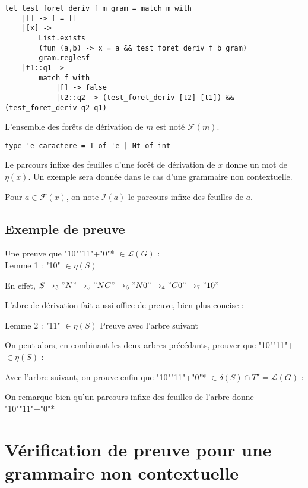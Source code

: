 \documentclass[a4paper,12pt]{article}
\begin{document}
\begin{verbatim}
let test_foret_deriv f m gram = match m with
    |[] -> f = []
    |[x] -> 
        List.exists 
        (fun (a,b) -> x = a && test_foret_deriv f b gram) 
        gram.reglesf
    |t1::q1 -> 
        match f with
            |[] -> false
            |t2::q2 -> (test_foret_deriv [t2] [t1]) && (test_foret_deriv q2 q1)
\end{verbatim}


L'ensemble des forêts de dérivation de $m$ est noté $\mathcal{F}(m)$.

\begin{verbatim}
type 'e caractere = T of 'e | Nt of int
\end{verbatim}

Le parcours infixe des feuilles d'une forêt de dérivation de $x$ donne un mot de $\eta(x)$.
Un exemple sera donnée dans le cas d'une grammaire non contextuelle.

Pour $a \in \mathcal{F}(x)$, on note $\mathcal{I}(a)$ le parcours infixe des feuilles de $a$. 

\subsection{Exemple de preuve}

Une preuve que "10""11"+"0"* $\in \mathcal{L}(G)$ :\\
Lemme 1 : "10" $\in \eta(S)$

    En effet, $S\rightarrow_3 "N" \rightarrow_5 "NC" \rightarrow_6 "N0" \rightarrow_4 "C0" \rightarrow_7 "10"$


L'abre de dérivation fait aussi office de preuve, bien plus concise :
   

Lemme 2 : "11" $\in \eta(S)$
Preuve avec l'arbre suivant
 

On peut alors, en combinant les deux arbres précédants, prouver que "10""11"+ $\in \eta(S)$ :
 

Avec l'arbre suivant, on prouve enfin que "10""11"+"0"* $\in \delta(S) \cap T^\star = \mathcal{L}(G)$ :
 

On remarque bien qu'un parcours infixe des feuilles de l'arbre donne "10""11"+"0"*

\section{Vérification de preuve pour une grammaire non contextuelle}
\end{document}
